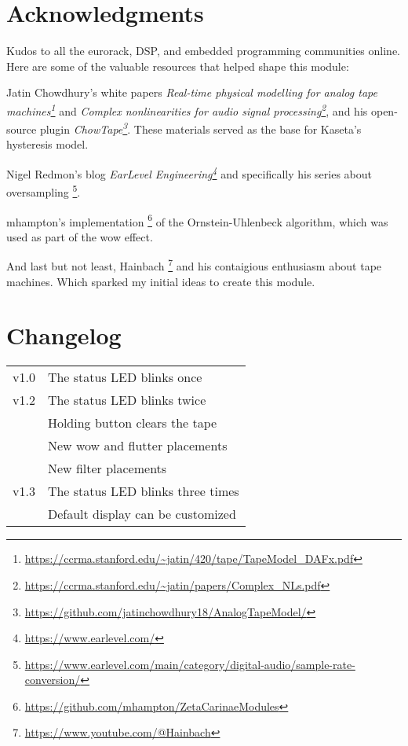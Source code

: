 \documentclass[11pt]{article}
\begin{document}
\newpage

\noindent
\begin{minipage}[t]{0.3\textwidth}
\setlength{\parskip}{6pt}
\section{Acknowledgments}

Kudos to all the eurorack, DSP, and embedded programming communities online.
Here are some of the valuable resources that helped shape this module:

Jatin Chowdhury's white papers
\textit{Real-time physical modelling for analog tape machines\footnote{
  \url{https://ccrma.stanford.edu/~jatin/420/tape/TapeModel_DAFx.pdf}
}}
and
\textit{Complex nonlinearities for audio signal processing\footnote{
  \url{https://ccrma.stanford.edu/~jatin/papers/Complex_NLs.pdf}
}},
and his open-source plugin
\textit{ChowTape\footnote{
  \url{https://github.com/jatinchowdhury18/AnalogTapeModel/}
}}. These materials served as the base for Kaseta's hysteresis model.

Nigel Redmon's blog
\textit{EarLevel Engineering\footnote{
  \url{https://www.earlevel.com/}
}}
and specifically his series about oversampling%
\footnote{\url{https://www.earlevel.com/main/category/digital-audio/sample-rate-conversion/}}.

mhampton's implementation%
\footnote{\url{https://github.com/mhampton/ZetaCarinaeModules}}
of the Ornstein-Uhlenbeck algorithm, which was used as part of the wow effect.

And last but not least, Hainbach%
\footnote{\url{https://www.youtube.com/@Hainbach}}
and his contaigious enthusiasm about tape machines. Which sparked my initial
ideas to create this module.

\vspace{2.5cm}

\end{minipage}%
\begin{minipage}{0.05\textwidth}
\phantom{ }
\end{minipage}%
\begin{minipage}[t]{0.3\textwidth}
\section{Changelog}

\begin{tabular}{@{}rl@{}}
  v1.0 & The status LED blinks once \\
  v1.2 & The status LED blinks twice \\
   & Holding button clears the tape \\
   & New wow and flutter placements \\
   & New filter placements \\
  v1.3 & The status LED blinks three times \\
   & Default display can be customized
\end{tabular}

\end{minipage}
\end{document}
